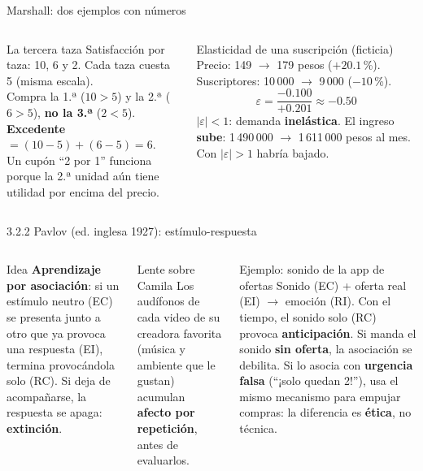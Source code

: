\documentclass[aspectratio=169,xcolor=dvipsnames]{beamer}
\begin{document}
\begin{frame}{Marshall: dos ejemplos con números}
\begin{columns}[T]
  \begin{exampleblock}{La tercera taza}
    \footnotesize Satisfacción por taza: 10, 6 y 2. Cada taza cuesta 5 (misma escala).\\[2pt]
    Compra la 1.ª ($10>5$) y la 2.ª ($6>5$), \textbf{no la 3.ª} ($2<5$).\\[2pt]
    \textbf{Excedente} $=(10-5)+(6-5)=6$.\\[2pt]
    Un cupón \enquote{2 por 1} funciona porque la 2.ª unidad aún tiene utilidad por encima del precio.
  \end{exampleblock}
  \begin{block}{Elasticidad de una suscripción (ficticia)}
    \footnotesize Precio: 149 $\to$ 179 pesos ($+20.1$\,\%). Suscriptores: 10\,000 $\to$ 9\,000 ($-10$\,\%).
    \[ \varepsilon=\frac{-0.100}{+0.201}\approx-0.50 \]
    $|\varepsilon|<1$: demanda \textbf{inelástica}. El ingreso \textbf{sube}: 1\,490\,000 $\to$ 1\,611\,000 pesos al mes.\\[2pt]
    Con $|\varepsilon|>1$ habría bajado.
  \end{block}
\end{columns}
\end{frame}

\begin{frame}{3.2.2 Pavlov (ed. inglesa 1927): estímulo-respuesta}
\begin{columns}[T]
  \begin{block}{Idea}
    \footnotesize \textbf{Aprendizaje por asociación}: si un estímulo neutro (EC) se presenta junto a otro que ya provoca una respuesta (EI), termina provocándola solo (RC). Si deja de acompañarse, la respuesta se apaga: \textbf{extinción}.
  \end{block}
  \begin{alertblock}{Lente sobre Camila}
    \footnotesize Los audífonos de cada video de su creadora favorita (música y ambiente que le gustan) acumulan \textbf{afecto por repetición}, antes de evaluarlos.
  \end{alertblock}
  \begin{exampleblock}{Ejemplo: sonido de la app de ofertas}
    \scriptsize Sonido (EC) + oferta real (EI) $\to$ emoción (RI). Con el tiempo, el sonido solo (RC) provoca \textbf{anticipación}. Si manda el sonido \textbf{sin oferta}, la asociación se debilita. Si lo asocia con \textbf{urgencia falsa} (\enquote{¡solo quedan 2!}), usa el mismo mecanismo para empujar compras: la diferencia es \textbf{ética}, no técnica.
  \end{exampleblock}
\end{columns}
\end{frame}
\end{document}
